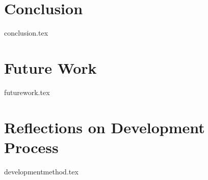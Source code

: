 \chapter{Conclusion}
{conclusion.tex}
\chapter{Future Work}
{futurework.tex}
\chapter{Reflections on Development Process}
{developmentmethod.tex}
